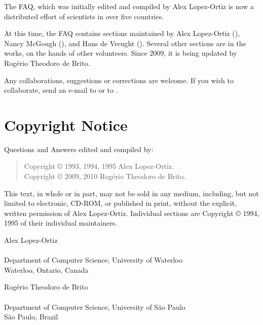 The \scimath FAQ, which was initially edited and compiled by Alex
Lopez-Ortiz is now a distributed effort of scientists in over five
countries.

At this time, the FAQ contains sections maintained by Alex Lopez-Ortiz
(\emailalopez), Nancy McGough (\emailnancy), and Hans de Vreught
(\emailhans).  Several other sections are in the works, on the hands of
other volunteers. Since 2009, it is being updated by Rogério Theodoro de
Brito.

Any collaborations, suggestions or corrections are welcome. If you wish
to collaborate, send an e-mail to \emailrbrito or to \emailalopez.

\section{Copyright Notice}

Questions and Answers edited and compiled by:

\begin{verse}
  Copyright © 1993, 1994, 1995 Alex Lopez-Ortiz.\\
  Copyright © 2009, 2010 Rogério Theodoro de Brito.
\end{verse}

\noindent
This text, in whole or in part, may not be sold in any medium,
including, but not limited to electronic, CD-ROM, or published in print,
without the explicit, written permission of Alex Lopez-Ortiz.
Individual sections are Copyright © 1994, 1995 of their individual
maintainers.

\noindent
Alex Lopez-Ortiz\\
\emailalopez\\
Department of Computer Science, University of Waterloo\\
Waterloo, Ontario, Canada

\medskip

\noindent
Rogério Theodoro de Brito\\
\emailrbrito\\
Department of Computer Science, University of São Paulo\\
São Paulo, Brazil
